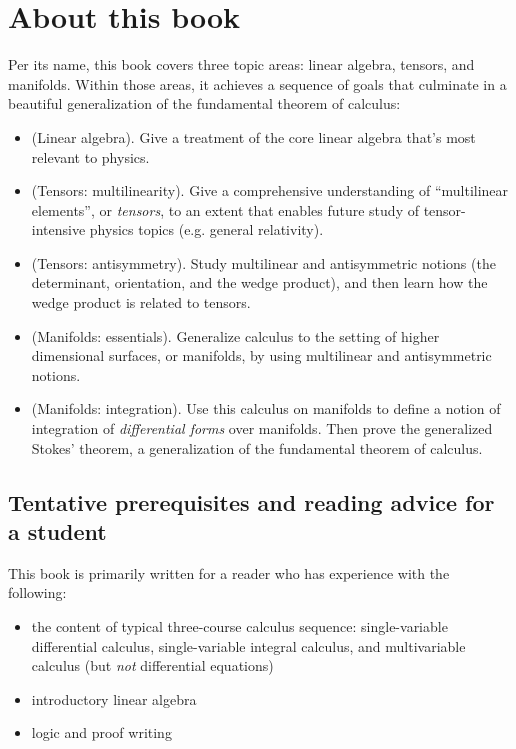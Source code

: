 \chapter*{About this book}

Per its name, this book covers three topic areas: linear algebra, tensors, and manifolds. Within those areas, it achieves a sequence of goals that culminate in a beautiful generalization of the fundamental theorem of calculus: 

\begin{itemize}
	\item (Linear algebra). Give a treatment of the core linear algebra that's most relevant to physics.
	\item (Tensors: multilinearity). Give a comprehensive understanding of ``multilinear elements'', or \textit{tensors}, to an extent that enables future study of tensor-intensive physics topics (e.g. general relativity).
	\item (Tensors: antisymmetry). Study multilinear and antisymmetric notions (the determinant, orientation, and the wedge product), and then learn how the wedge product is related to tensors.
	\item (Manifolds: essentials). Generalize calculus to the setting of higher dimensional surfaces, or manifolds, by using multilinear and antisymmetric notions.
	\item (Manifolds: integration). Use this calculus on manifolds to define a notion of integration of \textit{differential forms} over manifolds. Then prove the generalized Stokes' theorem, a  generalization of the fundamental theorem of calculus.
\end{itemize}

\section*{Tentative prerequisites and reading advice for a student}

This book is primarily written for a reader who has experience with the following:

\begin{itemize}
    \item the content of typical three-course calculus sequence: single-variable differential calculus, single-variable integral calculus, and multivariable calculus (but \textit{not} differential equations)
    \item introductory linear algebra
    \item logic and proof writing
\end{itemize}


